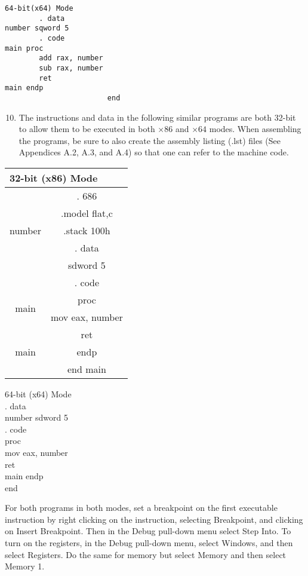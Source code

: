 \documentclass[10pt]{article}
\begin{document}
\begin{verbatim}
64-bit(x64) Mode
        . data
number sqword 5
        . code
main proc
        add rax, number
        sub rax, number
        ret
main endp
                        end
\end{verbatim}

\begin{enumerate}
  \setcounter{enumi}{9}
  \item The instructions and data in the following similar programs are both 32-bit to allow them to be executed in both $\times 86$ and $\times 64$ modes. When assembling the programs, be sure to also create the assembly listing (.lst) files (See Appendices A.2, A.3, and A.4) so that one can refer to the machine code.
\end{enumerate}

\begin{center}
\begin{tabular}{|c|c|}
\hline
\multicolumn{2}{|l|}{32-bit (x86) Mode} \\
\hline
\multirow[b]{5}{*}{number} & . 686 \\
\hline
 & .model flat,c \\
\hline
 & .stack 100h \\
\hline
 & . data \\
\hline
 & sdword 5 \\
\hline
 & . code \\
\hline
\multirow[t]{2}{*}{main} & proc \\
\hline
 & mov eax, number \\
\hline
\multirow{3}{*}{main} & ret \\
\hline
 & endp \\
\hline
 & end main \\
\hline
\end{tabular}
\end{center}

64-bit (x64) Mode\\
. data\\
number sdword 5\\
. code\\
proc\\
mov eax, number\\
ret\\
main endp\\
end

For both programs in both modes, set a breakpoint on the first executable instruction by right clicking on the instruction, selecting Breakpoint, and clicking on Insert Breakpoint. Then in the Debug pull-down menu select Step Into. To turn on the registers, in the Debug pull-down menu, select Windows, and then select Registers. Do the same for memory but select Memory and then select Memory 1.
\end{document}

